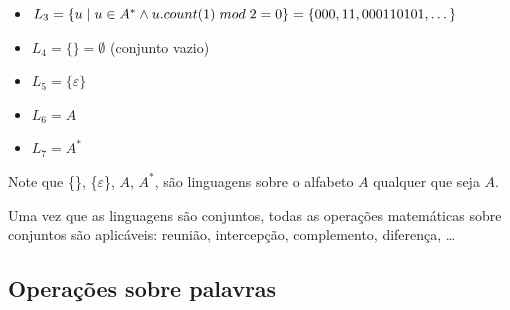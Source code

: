 \documentclass{article}
\begin{document}
\begin{flushleft}
\begin{itemize}
    \item $L_3 = \{u \hspace{1mm} | \hspace{1mm} u \in A^* \wedge u.count(1) \hspace{1mm} mod \hspace{1mm} 2 = 0\} = \{000,11,000110101,\dots\}$
    \item $L_4 = \{\} = \emptyset$ (conjunto vazio)
    \item $L_5 = \{\varepsilon\}$
    \item $L_6 = A$
    \item $L_7 = A^*$
  \end{itemize}
  \item Note que \{\}, \{$\varepsilon$\}, $A$, $A^*$, são linguagens sobre o alfabeto
  $A$ qualquer que seja $A$.
  \item Uma vez que as linguagens são conjuntos, todas as
  operações matemáticas sobre conjuntos são aplicáveis:
  reunião, intercepção, complemento, diferença, \dots
\end{flushleft}

\subsection{Operações sobre palavras}
\end{document}
